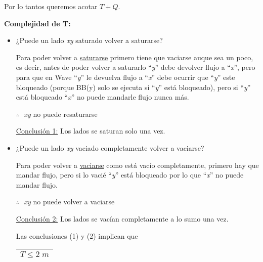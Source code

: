 \documentclass[12pt,a4paper]{report}
\begin{document}
		Por lo tantos queremos acotar $T + Q$.

		\vspace{5mm}
		\textbf{Complejidad de T:}
		\begin{itemize}
			\item ¿Puede un lado \textit{xy} saturado volver a saturarse?

			Para poder volver a \underline{saturarse} primero tiene que vaciarse auque sea un poco, es decir, antes de poder volver a saturarlo \textquotedblleft \textit{y}\textquotedblright \; debe devolver flujo a \textquotedblleft \textit{x}\textquotedblright \;, pero para que en Wave \textquotedblleft \textit{y}\textquotedblright \; le devuelva flujo a \textquotedblleft \textit{x}\textquotedblright \;  debe ocurrir que \textquotedblleft \textit{y}\textquotedblright \; este bloqueado (porque BB(y) solo se ejecuta si \textquotedblleft \textit{y}\textquotedblright \; está bloqueado), pero si \textquotedblleft \textit{y}\textquotedblright \; está bloqueado \textquotedblleft \textit{x}\textquotedblright \; no puede mandarle flujo nunca más.

			\begin{center}
				$ \therefore \;$ \textit{xy} no puede resaturarse
			\end{center}

			\underline{Conclusión 1:} Los lados se saturan solo una vez.

			\item ¿Puede un lado \textit{xy} vaciado completamente volver a vaciarse?

			Para poder volver a \underline{vaciarse} como está vacío completamente, primero hay que mandar flujo, pero si lo vacié \textquotedblleft \textit{y}\textquotedblright \; está bloqueado por lo que \textquotedblleft \textit{x}\textquotedblright \; no puede mandar flujo.

			\begin{center}
				$ \therefore \;$ \textit{xy} no puede volver a vaciarse
			\end{center}

			\underline{Conclusión 2:} Los lados se vacían completamente a lo sumo una vez.

			Las conclusiones (1) y (2) implican que \begin{tabular}{|c|} \hline $T \leq 2 \; m$ \\ \hline \end{tabular}
		\end{itemize}
\end{document}

